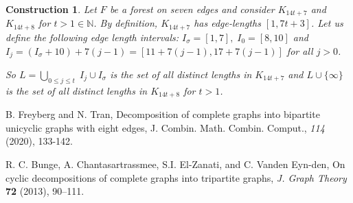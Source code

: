 \documentclass[addpoints,11pt]{exam}
\newtheorem{const}[theorem]{Construction}
\theoremstyle{definition}
\newcommand{\NN}{\ensuremath{\mathbb{N}}}
\begin{document}
\begin{const}
Let $F$ be a forest on seven edges and consider $K_{14t+7}$ and $K_{14t+8}$ for $t > 1\in \NN$. By definition, $K_{14t+7}$ has edge-lengths $[1,7t+3]$.
Let us define the following edge length intervals: $I_{\sigma}=[1,7],\;I_{0}=[8,10]$ and $I_{j}=(I_{\sigma}+10)+7(j-1)=[11+7(j-1),17+7(j-1)]$ for all $j>0$.

So $L=\bigcup\limits_{0\leq j\leq t}\;I_{j}\cup I_{\sigma}$ is the set of all distinct lengths in $K_{14t+7}$ and $L\cup \{\infty\}$ is the set of all distinct lengths in $K_{14t+8}$ for $t>1$. 
\end{const}

\begin{thebibliography}{99}

  B. Freyberg and N. Tran, Decomposition of complete graphs into bipartite unicyclic graphs with eight edges, J. Combin. Math. Combin. Comput., \emph{114} (2020), 133-142.

R. C. Bunge, A. Chantasartrassmee, S.I. El-Zanati, and C. Vanden Eyn-den, On cyclic decompositions of complete graphs into tripartite graphs, \emph{J. Graph Theory} \textbf{72} (2013), 90--111.

  \end{thebibliography}
\end{document}
